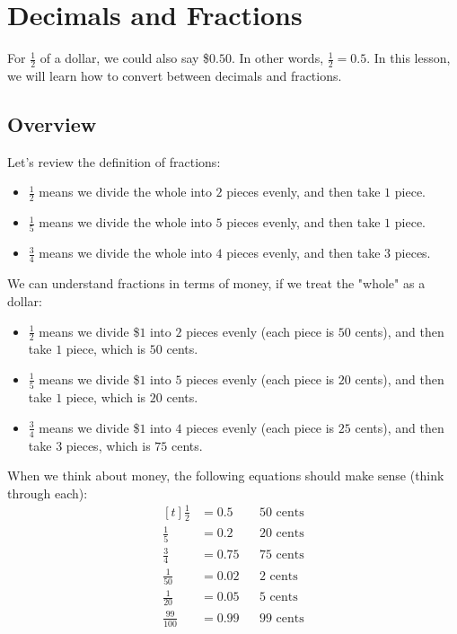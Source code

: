 
\section{Decimals and Fractions}

For $\frac{1}{2}$ of a dollar, we could also say \$$0.50$. In other words, $\frac{1}{2}=0.5$. In this lesson, we will learn how to convert between decimals and fractions.

\subsection{Overview}
Let's review the definition of fractions:
\begin{itemize}
\item $\frac{1}{2}$ means we divide the whole into $2$ pieces evenly, and then take $1$ piece.
\item $\frac{1}{5}$ means we divide the whole into $5$ pieces evenly, and then take $1$ piece.
\item $\frac{3}{4}$ means we divide the whole into $4$ pieces evenly, and then take $3$ pieces.
\end{itemize}

We can understand fractions in terms of money, if we treat the "whole" as a dollar:
\begin{itemize}
\item $\frac{1}{2}$ means we divide \$$1$ into $2$ pieces evenly (each piece is $50$ cents), and then take $1$ piece, which is $50$ cents.
\item $\frac{1}{5}$ means we divide \$$1$ into $5$ pieces evenly (each piece is $20$ cents), and then take $1$ piece, which is $20$ cents.
\item $\frac{3}{4}$ means we divide \$$1$ into $4$ pieces evenly (each piece is $25$ cents), and then take $3$ pieces, which is $75$ cents.
\end{itemize}

When we think about money, the following equations should make sense (think through each):
\[
\begin{aligned}[t]
	\frac{1}{2} &= 0.5 &&50 \text{ cents}\\
	\frac{1}{5} &= 0.2 &&20 \text{ cents}\\
	\frac{3}{4} &= 0.75 &&75 \text{ cents}\\
	\frac{1}{50} &= 0.02 &&2 \text{ cents}\\
	\frac{1}{20} &= 0.05 &&5 \text{ cents}\\
	\frac{99}{100} &= 0.99 &&99 \text{ cents}
\end{aligned}
\]

